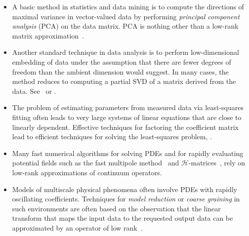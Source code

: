 \documentclass{article}
\begin{document}
\begin{itemize}
\item   A basic method in statistics and data mining is to compute the
directions of maximal variance in vector-valued data by performing
\emph{principal component analysis} (PCA) on the data matrix.
PCA is nothing other than a low-rank matrix
approximation~\cite[\S14.5]{HTF08:Elements-Statistical}.

\item   Another standard technique in data analysis is to perform
low-dimensional embedding of data under the assumption that there
are fewer degrees of freedom than the ambient dimension would suggest.
In many cases, the method reduces to computing a partial SVD of a matrix
derived from the data.  See~\cite[\S\S14.8--14.9]{HTF08:Elements-Statistical}
or \cite{coifman_PNAS_diffusionmaps}.

\item The problem of estimating parameters from measured data via
least-squares fitting often leads to very large systems of linear
equations that are close to linearly dependent. Effective techniques
for factoring the coefficient matrix lead to efficient techniques
for solving the least-squares problem,
\cite{2008_rokhlin_leastsquares}.

\item   Many fast numerical algorithms for solving PDEs and for rapidly evaluating
potential fields such as the fast multipole method~\cite{rokhlin1997}
and $\mathcal{H}$-matrices~\cite{hackbusch2003}, rely on low-rank approximations of
continuum operators.

\item Models of multiscale physical phenomena often involve PDEs with rapidly
oscillating coefficients. Techniques for  \emph{model reduction}
or \emph{coarse graining} in such environments are often based %
on the observation that the linear transform that maps the input data to the requested output
data %
can be approximated by an operator of low rank~\cite{engquist_wavelethomogenization}.
\end{itemize}
\end{document}
